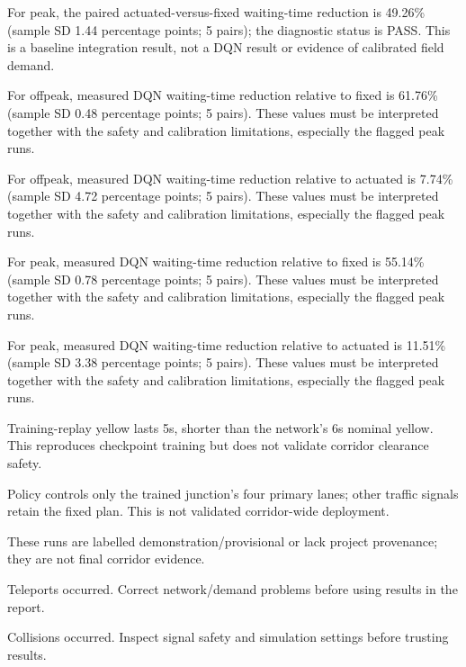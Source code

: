 \documentclass[conference]{IEEEtran}
\begin{document}
For peak, the paired actuated-versus-fixed waiting-time reduction is 49.26\% (sample SD 1.44 percentage points; 5 pairs); the diagnostic status is PASS. This is a baseline integration result, not a DQN result or evidence of calibrated field demand.

For offpeak, measured DQN waiting-time reduction relative to fixed is 61.76\% (sample SD 0.48 percentage points; 5 pairs). These values must be interpreted together with the safety and calibration limitations, especially the flagged peak runs.

For offpeak, measured DQN waiting-time reduction relative to actuated is 7.74\% (sample SD 4.72 percentage points; 5 pairs). These values must be interpreted together with the safety and calibration limitations, especially the flagged peak runs.

For peak, measured DQN waiting-time reduction relative to fixed is 55.14\% (sample SD 0.78 percentage points; 5 pairs). These values must be interpreted together with the safety and calibration limitations, especially the flagged peak runs.

For peak, measured DQN waiting-time reduction relative to actuated is 11.51\% (sample SD 3.38 percentage points; 5 pairs). These values must be interpreted together with the safety and calibration limitations, especially the flagged peak runs.

Training-replay yellow lasts 5s, shorter than the network's 6s nominal yellow. This reproduces checkpoint training but does not validate corridor clearance safety.

Policy controls only the trained junction's four primary lanes; other traffic signals retain the fixed plan. This is not validated corridor-wide deployment.

These runs are labelled demonstration/provisional or lack project provenance; they are not final corridor evidence.

Teleports occurred. Correct network/demand problems before using results in the report.

Collisions occurred. Inspect signal safety and simulation settings before trusting results.
\end{document}
